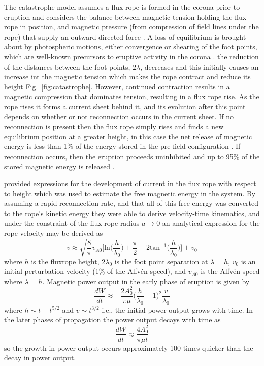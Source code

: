 The catastrophe model assumes a flux-rope is formed in the corona prior to eruption and considers the balance between magnetic tension holding the flux rope in position, and magnetic pressure (from compression of field lines under the rope) that supply an outward directed force \citep{forbes1991, lin2000, priest2000}. A loss of equilibrium is brought about by photospheric motions, either convergence or shearing of the foot points, which are well-known precursors to eruptive activity in the corona \citep{rust1972}. the reduction of the distances between the foot points, $2\lambda$, decreases and this initially 
causes an increase int the magnetic tension which makes the rope contract and reduce its height Fig.~\ref{fig:catastrophe}. However, continued contraction results in a magnetic compression that  dominates tension, resulting in a flux rope rise. As the rope rises it forms a current sheet behind it, and its evolution after this point depends on whether or not reconnection occurs in the current sheet. If no reconnection is present then the flux rope simply rises and finds a new equilibrium position at a greater height, in this case the net release of magnetic energy is less than 1\% of the energy stored in the pre-field configuration \citep{forbes1991}. If reconnection occurs, then the eruption proceeds uninhibited and up to 95\% of the stored magnetic energy is released \citep{forbes1995}.

\citet{forbes1995} provided expressions for the development of current in the flux rope with respect to height which was used to estimate the free magnetic energy in the system. By assuming a rapid reconnection rate, and that all of this free energy was converted to the rope's kinetic energy they were able to derive velocity-time kinematics, and under the constraint of the flux rope radius $a\rightarrow 0$ an analytical expression for the rope velocity may be derived as \citep{priest2000}
\begin{equation}
v\approx \sqrt{  \frac{8}{\pi}  }v_{A0}\bigg[\mathrm{ln}\bigg( \frac{h}{\lambda_0}\bigg) + \frac{\pi}{2}  - 2\mathrm{tan}^{-1} \bigg( \frac{h}{\lambda_0}\bigg)\bigg] + v_0
\end{equation}
where $h$ is the fluxrope height, $2\lambda_0$ is the foot point separation at $\lambda=h$, $v_0$ is an initial perturbation velocity (1\% of the Alfv\'{e}n speed), and $v_{A0}$ is the Alfv\'{e}n speed where $\lambda=h$. Magnetic power output in the early phase of eruption is given by
\begin{equation}
\frac{dW}{dt} \approx -\frac{2A_0^2}{\pi\mu}\bigg( \frac{h}{\lambda_0} -1\bigg)^2\frac{v}{\lambda_0}
\end{equation}
where $h\sim t + t^{5/2}$ and $v\sim t^{3/2}$ i.e., the initial power output grows with time. In the later phases of propagation the power output decays with time as
\begin{equation}
\frac{dW}{dt} \approx \frac{4A_0^2}{\pi \mu t}
\end{equation}
so the growth in power output occurs approximately 100 times quicker than the decay in power output.

